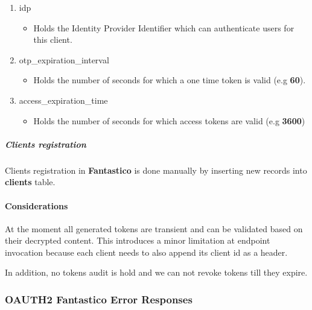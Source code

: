 \documentclass[letterpaper,10pt,english]{sphinxmanual}
\begin{document}
\begin{enumerate}
\begin{itemize}
\end{itemize}

\item {} 
idp
\begin{itemize}
\item {} 
Holds the Identity Provider Identifier which can authenticate users for this client.

\end{itemize}

\item {} 
otp\_expiration\_interval
\begin{itemize}
\item {} 
Holds the number of seconds for which a one time token is valid (e.g \textbf{60}).

\end{itemize}

\item {} 
access\_expiration\_time
\begin{itemize}
\item {} 
Holds the number of seconds for which access tokens are valid (e.g \textbf{3600})

\end{itemize}

\end{enumerate}


\subparagraph{Clients registration}
\label{features/oauth2/tokens_storage:clients-registration}
Clients registration in \textbf{Fantastico} is done manually by inserting new records into \textbf{clients} table.


\paragraph{Considerations}
\label{features/oauth2/tokens_storage:considerations}
At the moment all generated tokens are transient and can be validated based on their decrypted content. This introduces a
minor limitation at endpoint invocation because each client needs to also append its client id as a header.

In addition, no tokens audit is hold and we can not revoke tokens till they expire.


\subsubsection{OAUTH2 Fantastico Error Responses}
\label{features/oauth2/error_responses::doc}\label{features/oauth2/error_responses:oauth2-fantastico-error-responses}
\end{document}
